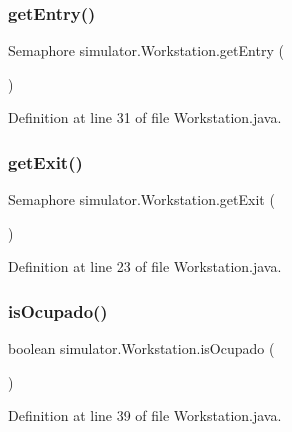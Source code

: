 \subsubsection{\texorpdfstring{get\+Entry()}{getEntry()}}
{\footnotesize\ttfamily Semaphore simulator.\+Workstation.\+get\+Entry (\begin{DoxyParamCaption}{ }\end{DoxyParamCaption})}



Definition at line 31 of file Workstation.\+java.

\mbox{\label{classsimulator_1_1_workstation_a0d389f9b0ca28ff6648467370afdb858}} 
\subsubsection{\texorpdfstring{get\+Exit()}{getExit()}}
{\footnotesize\ttfamily Semaphore simulator.\+Workstation.\+get\+Exit (\begin{DoxyParamCaption}{ }\end{DoxyParamCaption})}



Definition at line 23 of file Workstation.\+java.

\mbox{\label{classsimulator_1_1_workstation_a9a306b4b5b6b740f9d284903c0f0eda4}} 
\subsubsection{\texorpdfstring{is\+Ocupado()}{isOcupado()}}
{\footnotesize\ttfamily boolean simulator.\+Workstation.\+is\+Ocupado (\begin{DoxyParamCaption}{ }\end{DoxyParamCaption})}



Definition at line 39 of file Workstation.\+java.

\mbox{\label{classsimulator_1_1_workstation_acf19a56acc88e29bdc0a394287eb6108}} 
